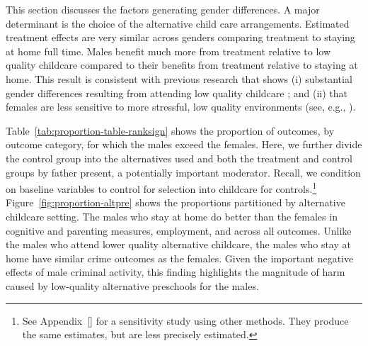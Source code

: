 This section discusses the factors generating gender differences. A major determinant is the choice of the alternative child care arrangements.
Estimated treatment effects are very similar across genders comparing treatment to staying at home full time. Males benefit much more from treatment relative to low quality childcare compared to their benefits from treatment relative to staying at home. This result is consistent with previous research that shows (i) substantial gender differences resulting from attending low quality childcare \citep{Kottelenberg-Lehrer_2014_Gender-Effects,Baker_Gruber_Milligan_2015_Noncog_Defects}; and (ii) that females are less sensitive to more stressful, low quality environments (see, e.g., \citealp{golding2016psychology,Autor-etal_2015_Family-Disadvantage}).

Table~\ref{tab:proportion-table-ranksign} shows the proportion of outcomes, by outcome category, for which the males exceed the females. Here, we further divide the control group into the alternatives used and both the treatment and control groups by father present, a potentially important moderator. Recall, we condition on baseline variables to control for selection into childcare for controls.\footnote{See Appendix~\ref{} for a sensitivity study using other methods. They produce the same estimates, but are less precisely estimated.} Figure~\ref{fig:proportion-altpre} shows the proportions partitioned by alternative childcare setting. The males who stay at home do better than the females in cognitive and parenting measures, employment, and across all outcomes. Unlike the males who attend lower quality alternative childcare, the males who stay at home have similar crime outcomes as the females. Given the important negative effects of male criminal activity, this finding highlights the magnitude of harm caused by low-quality alternative preschools for the males. 

